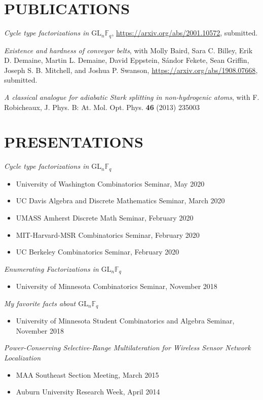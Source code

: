 \documentclass{res}
\begin{document}
\begin{resume}
\section{PUBLICATIONS}
  \vspace{2mm}

{\it Cycle type factorizations in \(\mathrm{GL}_n \mathbb{F}_q\)},
\url{https://arxiv.org/abs/2001.10572},
submitted.

{\it Existence and hardness of conveyor belts},
with Molly Baird, Sara C. Billey, Erik D. Demaine, Martin L. Demaine, David Eppstein, S\'andor Fekete, Sean Griffin, Joseph S. B. Mitchell, and Joshua P. Swanson,
\url{https://arxiv.org/abs/1908.07668},
submitted.

{\it A classical analogue for adiabatic Stark splitting in non-hydrogenic atoms},
with F. Robicheaux,
J. Phys. B: At. Mol. Opt. Phys. {\bf 46} (2013) 235003

\section{PRESENTATIONS}
  \vspace{2mm}
{\it Cycle type factorizations in \(\mathrm{GL}_n \mathbb{F}_q\)}
\begin{itemize}
\item University of Washington Combinatorics Seminar, May 2020
\item UC Davis Algebra and Discrete Mathematics Seminar, March 2020
\item UMASS Amherst Discrete Math Seminar, February 2020
\item MIT-Harvard-MSR Combinatorics Seminar, February 2020
\item UC Berkeley Combinatorics Seminar, February 2020
\end{itemize}

{\it Enumerating Factorizations in \(\mathrm{GL}_n \mathbb{F}_q\)}
\begin{itemize}
\item University of Minnesota Combinatorics Seminar, November 2018
\end{itemize}

{\it My favorite facts about \(\mathrm{GL}_n \mathbb{F}_q\)}
\begin{itemize}
\item University of Minnesota Student Combinatorics and Algebra Seminar, November 2018
\end{itemize}

{\it Power-Conserving Selective-Range Multilateration for Wireless Sensor Network Localization}
\begin{itemize}
\item MAA Southeast Section Meeting, March 2015
\item Auburn University Research Week, April 2014
\end{itemize}


\end{resume}
\end{document}
